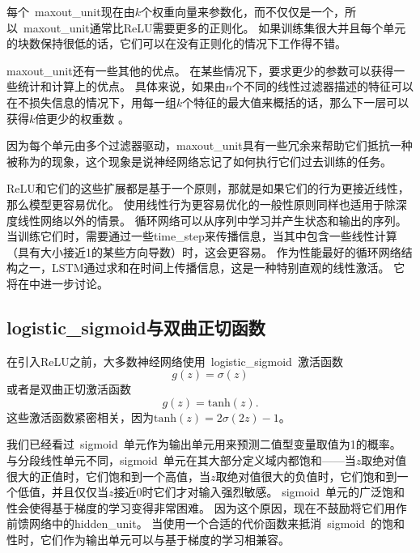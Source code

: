 每个~\gls{maxout_unit}现在由$k$个权重向量来参数化，而不仅仅是一个，所以~\gls{maxout_unit}通常比\gls{ReLU}需要更多的正则化。
如果训练集很大并且每个单元的块数保持很低的话，它们可以在没有正则化的情况下工作得不错\citep{Cai-et-al-2013}。

\gls{maxout_unit}还有一些其他的优点。
在某些情况下，要求更少的参数可以获得一些统计和计算上的优点。
具体来说，如果由$n$个不同的线性过滤器描述的特征可以在不损失信息的情况下，用每一组$k$个特征的最大值来概括的话，那么下一层可以获得$k$倍更少的权重数 。

因为每个单元由多个过滤器驱动，\gls{maxout_unit}具有一些冗余来帮助它们抵抗一种被称为的现象，这个现象是说神经网络忘记了如何执行它们过去训练的任务\citep{Goodfellow-et-al-2014a}。

\gls{ReLU}和它们的这些扩展都是基于一个原则，那就是如果它们的行为更接近线性，那么模型更容易优化。
使用线性行为更容易优化的一般性原则同样也适用于除深度线性网络以外的情景。
循环网络可以从序列中学习并产生状态和输出的序列。
当训练它们时，需要通过一些\gls{time_step}来传播信息，当其中包含一些线性计算（具有大小接近1的某些方向导数）时，这会更容易。
作为性能最好的循环网络结构之一，LSTM通过求和在时间上传播信息，这是一种特别直观的线性激活。
它将在中进一步讨论。


\subsection{\gls{logistic_sigmoid}与双曲正切函数}
\label{sec:logistic_sigmoid_and_hyperbolic_tangent}

在引入\gls{ReLU}之前，大多数神经网络使用~\gls{logistic_sigmoid}~激活函数
\begin{equation}
g(z) = \sigma(z)
\end{equation}
或者是双曲正切激活函数
\begin{equation}
g(z) = \text{tanh}(z).
\end{equation}
这些激活函数紧密相关，因为$\text{tanh}(z)=2\sigma(2z)-1$。

我们已经看过~\gls{sigmoid}~单元作为输出单元用来预测二值型变量取值为1的概率。
与分段线性单元不同，\gls{sigmoid}~单元在其大部分定义域内都饱和——当$z$取绝对值很大的正值时，它们饱和到一个高值，当$z$取绝对值很大的负值时，它们饱和到一个低值，并且仅仅当$z$接近0时它们才对输入强烈敏感。
\gls{sigmoid}~单元的广泛饱和性会使得基于梯度的学习变得非常困难。
因为这个原因，现在不鼓励将它们用作前馈网络中的\gls{hidden_unit}。
当使用一个合适的代价函数来抵消~\gls{sigmoid}~的饱和性时，它们作为输出单元可以与基于梯度的学习相兼容。

